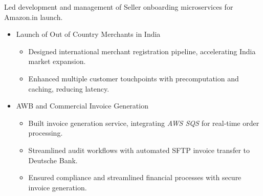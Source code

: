 {Led development and management of Seller onboarding microservices for Amazon.in launch.\newline{}
\begin{itemize}
\setlength\itemsep{1em}
    \item Launch of Out of Country Merchants in India 
        \begin{itemize}
            \item Designed international merchant registration pipeline, accelerating India market expansion.
            \item Enhanced multiple customer touchpoints with precomputation and caching, reducing latency.
        \end{itemize}
    \item AWB and Commercial Invoice Generation
        \begin{itemize}
            \item Built invoice generation service, integrating \textit{AWS SQS} for real-time order processing.
            \item Streamlined audit workflows with automated SFTP invoice transfer to Deutsche Bank.
            \item Ensured compliance and streamlined financial processes with secure invoice generation.
        \end{itemize}
\end{itemize}}